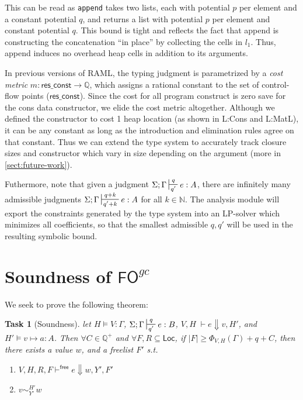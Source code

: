 \documentclass{easychair}
\newcounter{group}
\newtheorem{theorem}{Task}[group]
\newcommand{\ms}[1]{\ensuremath{\mathsf{#1}}}
\newcounter{rule}
\newcommand{\veq}[4]{#3 \sim^{#1}_{#2} #4}
\newcommand{\fogc}{\ms{FO}^{gc}}
\theoremstyle{definition}
\begin{document}
This can be read as \texttt{append} takes two lists, each with potential $p$ per element  
and a constant potential $q$, and returns a list with potential $p$ per element and constant 
potential $q$. This bound is tight and reflects the fact that append is constructing the 
concatenation ``in place'' by collecting the cells in $l_1$. Thus, append induces no overhead 
heap cells in addition to its arguments.

In previous versions of RAML, the typing judgment is parametrized by a \emph{cost metric} 
$m : \ms{res\_const \to \mathbb{Q}}$, which assigns a rational constant to 
the set of control-flow points (\ms{res\_const}). 
Since the cost for all program construct is zero save for the cons
data constructor, we elide the cost metric altogether. Although we defined the constructor to cost
1 heap location (as shown in L:Cons and L:MatL), it can be any constant as long as the introduction
and elimination rules agree on that constant. Thus we can extend the type system to accurately track
closure sizes and constructor which vary in size depending on the argument (more in 
\ref{sect:future-work}).

Futhermore, note that given a judgment $\Sigma;\Gamma \sststile{q'}{q} e : A$, there are 
infinitely many admissible judgments $\Sigma;\Gamma \sststile{q' + k}{q + k} e : A$ 
for all $k \in \mathbb{N}$. The analysis module will export the constraints generated 
by the type system into an LP-solver which minimizes all coefficients, so that the 
smallest admissible $q,q'$ will be used in the resulting symbolic bound.

\section{Soundness of $\fogc$}

We seek to prove the following theorem: 

\begin{theorem}[Soundness]
\label{itm:soundness} let $H \vDash V : \Gamma$, $\Sigma; \Gamma \sststile{q'}{q} e : B$,
$V,H \; \vdash e \Downarrow v, H'$, and $H' \vDash v \mapsto a : A$.
Then $\forall C \in \mathbb{Q}^{+}$ and $\forall F,R \subseteq \ms{Loc}$,
if $|F| \ge \Phi_{V,H}(\Gamma) + q + C$,
then there exists a value $w$, and a freelist $F'$ s.t.
\begin{enumerate}
	\item $V,H,R,F \vdash^{\ms{free}} e \Downarrow w, Y', F'$
	\item $\veq{H'}{Y'}{v}{w}$
\end{enumerate}
\end{theorem}
\end{document}
